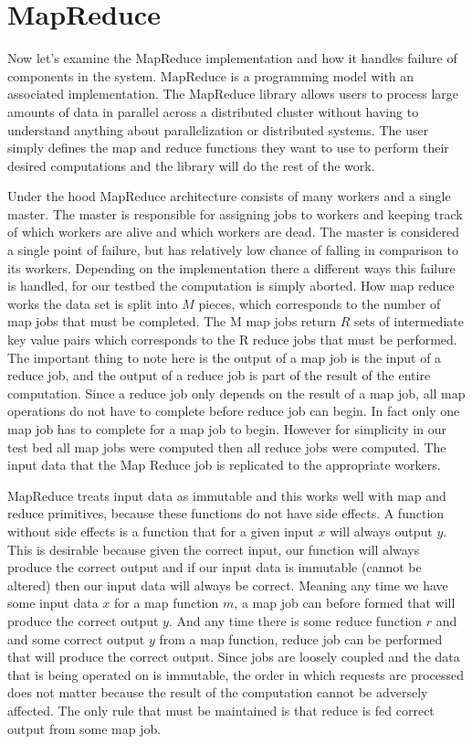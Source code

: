 \documentclass[conference]{IEEEtran}
\begin{document}
\section{MapReduce}
Now let's examine the MapReduce implementation and how it handles failure of components in the system. MapReduce is a programming model with an associated implementation. The MapReduce library allows users to process large amounts of data in parallel across a distributed cluster without having to understand anything about parallelization or distributed systems. The user simply defines the map and reduce functions they want to use to perform their desired computations and the library will do the rest of the work.

Under the hood MapReduce architecture consists of many workers and a single master. The master is responsible for assigning jobs to workers and keeping track of which workers are alive and which workers are dead. The master is considered a single point of failure, but has relatively low chance of falling in comparison to its workers. Depending on the implementation there a different ways this failure is handled, for our testbed the computation is simply aborted. How map reduce works the data set is split into \(M\) pieces, which corresponds to the number of map jobs that must be completed.  The M map jobs return \(R\)  sets of intermediate key value pairs which corresponds to the R reduce jobs that must be performed. The important thing to note here is the output of a map job is the input of a reduce job, and the output of a reduce job is part of the result of the entire computation. Since a reduce job only depends on the result of a map job, all map operations do not have to complete before reduce job can begin. In fact only one map job has to complete for a map job to begin. However for simplicity in our test bed all map jobs were computed then all reduce jobs were computed. The input data that the Map Reduce job is replicated to the appropriate workers. 

MapReduce treats input data as immutable and this works well with map and reduce primitives, because these functions do not have side effects. A function without side effects is a function that for a given input \(x\) will always output \(y\). This is desirable because given the correct input, our function will always produce the correct output and if our input data is immutable (cannot be altered) then our input data will always be correct. Meaning any time we have some input data \(x\) for a map function \(m\), a map job can before formed that will produce the correct output \(y\). And any time there is some reduce function \(r\) and and  some correct output \(y\) from a map function, reduce job can be performed that will produce the correct output. Since jobs are loosely coupled and the data that is being operated on is immutable, the order in which requests are processed does not matter because the result of the computation cannot be adversely affected. The only rule that must be maintained is that reduce is fed correct output from some map job. 
\end{document}
